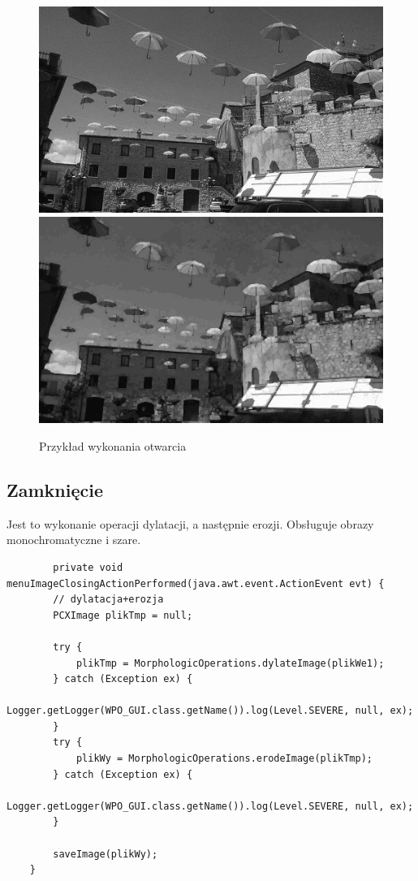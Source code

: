 \documentclass{article}
\begin{document}
\begin{figure}[!ht]
	\includegraphics[scale=1.2]{img/gray-obraz1}
	\includegraphics[scale=0.288]{img/morfologiczne/otwarcie-gray}
	\caption{Przykład wykonania otwarcia}
	\label{fig19}	
	\end{figure}	
	
	
	\subsection{Zamknięcie}
	Jest to wykonanie operacji dylatacji, a następnie erozji. 
	Obsługuje obrazy monochromatyczne i szare.
	
	\begin{verbatim}
	    private void menuImageClosingActionPerformed(java.awt.event.ActionEvent evt) {                                                 
        // dylatacja+erozja
        PCXImage plikTmp = null;

        try {
            plikTmp = MorphologicOperations.dylateImage(plikWe1);
        } catch (Exception ex) {
            Logger.getLogger(WPO_GUI.class.getName()).log(Level.SEVERE, null, ex);
        }
        try {
            plikWy = MorphologicOperations.erodeImage(plikTmp);
        } catch (Exception ex) {
            Logger.getLogger(WPO_GUI.class.getName()).log(Level.SEVERE, null, ex);
        }

        saveImage(plikWy);
    }              
	\end{verbatim}
	
\end{document}
